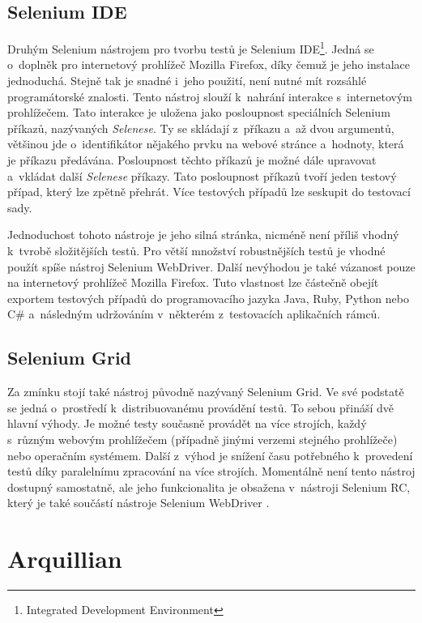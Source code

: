 \documentclass[
    color,   %
	table,   %
    twoside, %
    nolot, nolof,
]{fithesis3}
\begin{document}
\subsection{Selenium IDE}

Druhým Selenium nástrojem pro tvorbu testů je Selenium IDE\footnote{Integrated Development Environment}. Jedná se o~doplněk pro internetový prohlížeč Mozilla Firefox, díky čemuž je jeho instalace jednoduchá. Stejně tak je snadné i~jeho použití, není nutné mít rozsáhlé programátorské znalosti. Tento nástroj slouží k~nahrání interakce s~internetovým prohlížečem. Tato interakce je uložena jako posloupnost speciálních Selenium příkazů, nazývaných \emph{Selenese}. Ty se skládají z~příkazu a~až dvou argumentů, většinou jde o~identifikátor nějakého prvku na webové stránce a~hodnoty, která je příkazu předávána. Posloupnost těchto příkazů je možné dále upravovat a~vkládat další \emph{Selenese} příkazy. Tato posloupnost příkazů tvoří jeden testový případ, který lze zpětně přehrát. Více testových případů lze seskupit do testovací sady. \cite{Selenium}

Jednoduchost tohoto nástroje je jeho silná stránka, nicméně není příliš vhodný k~tvrobě složitějších testů. Pro větší množství robustnějších testů je vhodné použít spíše nástroj Selenium WebDriver. Další nevýhodou je také vázanost pouze na internetový prohlížeč Mozilla Firefox. Tuto vlastnost lze částečně obejít exportem testových případů do programovacího jazyka Java, Ruby, Python nebo C\# a~následným udržováním v~některém z~testovacích aplikačních rámců.

\subsection{Selenium Grid}
Za zmínku stojí také nástroj původně nazývaný Selenium Grid. Ve své podstatě se jedná o~prostředí k~distribuovanému provádění testů. To sebou přináší dvě hlavní výhody. Je možné testy současně provádět na více strojích, každý s~různým webovým prohlížečem (případně jinými verzemi stejného prohlížeče) nebo operačním systémem. Další z~výhod je snížení času potřebného k~provedení testů díky paralelnímu zpracování na více strojích. Momentálně není tento nástroj dostupný samostatně, ale jeho funkcionalita je obsažena v~nástroji Selenium RC, který je také součástí nástroje Selenium WebDriver \cite{Selenium}.

\section{Arquillian}
\end{document}
